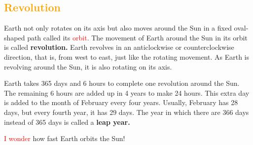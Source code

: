 \subsection{\textcolor{orange}{Revolution}}
Earth not only rotates on its axis but also moves around the Sun in a fixed oval-shaped path called its \textcolor{red}{orbit}. The movement of Earth around the Sun in its orbit is called \textbf{revolution.} Earth revolves in an anticlockwise or counterclockwise direction, that is, from west to east, just like the rotating movement. As Earth is revolving around the Sun, it is also rotating on its axis.
\par
\vspace{0.4in}
Earth takes 365 days and 6 hours to complete one revolution around the Sun. The remaining 6 hours are added up in 4 years to make 24 hours. This extra day is added to the month of February every four years. Usually, February has 28 days, but every fourth year, it has 29 days. The year in which there are 366 days instead of 365 days is called a \textbf{leap year.}
\par
\vspace{0.2in}
\textcolor{red}{I wonder} how fast Earth orbits the Sun!
\vspace{0.2in}
